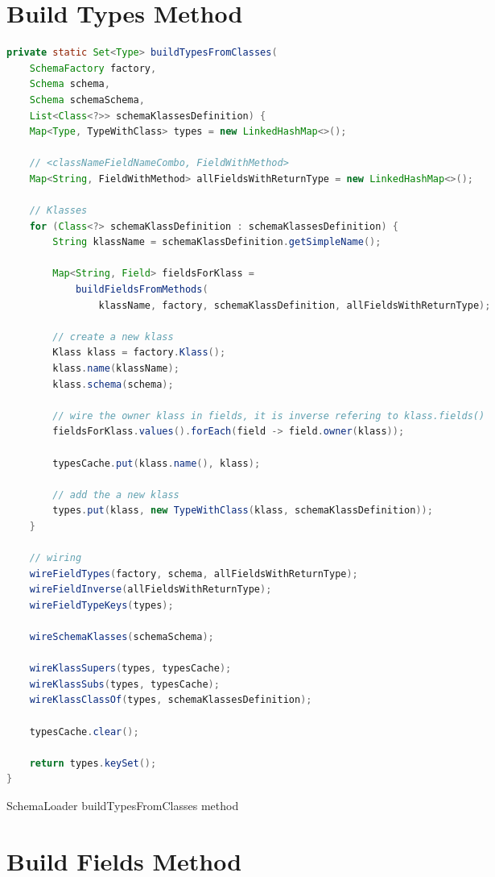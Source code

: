\section{Build Types Method}

\begin{sourcecode} [H]
	\begin{lstlisting}[language=Java, escapechar=|]
private static Set<Type> buildTypesFromClasses(
	SchemaFactory factory,
	Schema schema,
	Schema schemaSchema,
	List<Class<?>> schemaKlassesDefinition) {
	Map<Type, TypeWithClass> types = new LinkedHashMap<>();

	// <classNameFieldNameCombo, FieldWithMethod>
	Map<String, FieldWithMethod> allFieldsWithReturnType = new LinkedHashMap<>();

	// Klasses
	for (Class<?> schemaKlassDefinition : schemaKlassesDefinition) {
		String klassName = schemaKlassDefinition.getSimpleName();

		Map<String, Field> fieldsForKlass =
			buildFieldsFromMethods(
				klassName, factory, schemaKlassDefinition, allFieldsWithReturnType);

		// create a new klass
		Klass klass = factory.Klass();
		klass.name(klassName);
		klass.schema(schema);

		// wire the owner klass in fields, it is inverse refering to klass.fields()
		fieldsForKlass.values().forEach(field -> field.owner(klass));

		typesCache.put(klass.name(), klass);

		// add the a new klass
		types.put(klass, new TypeWithClass(klass, schemaKlassDefinition));
	}

	// wiring
	wireFieldTypes(factory, schema, allFieldsWithReturnType);
	wireFieldInverse(allFieldsWithReturnType);
	wireFieldTypeKeys(types);

	wireSchemaKlasses(schemaSchema);

	wireKlassSupers(types, typesCache);
	wireKlassSubs(types, typesCache);
	wireKlassClassOf(types, schemaKlassesDefinition);

	typesCache.clear();

	return types.keySet();
}
    \end{lstlisting}
	\caption{SchemaLoader buildTypesFromClasses method}
	\label{lst:SchemaLoader_buildTypesFromClasses}
\end{sourcecode}

\section{Build Fields Method}

